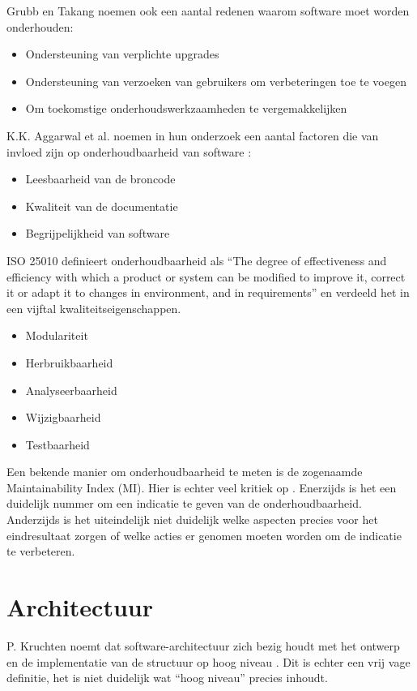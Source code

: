 Grubb en Takang noemen ook een aantal redenen waarom software moet worden onderhouden:
\begin{itemize}
	\item Ondersteuning van verplichte upgrades
	\item Ondersteuning van verzoeken van gebruikers om verbeteringen toe te voegen
	\item Om toekomstige onderhoudswerkzaamheden te vergemakkelijken
\end{itemize}

K.K. Aggarwal et al. noemen in hun onderzoek een aantal factoren die van invloed zijn op onderhoudbaarheid van software \parencite{MaintainabilityMeasure}:
\begin{itemize}
	\item Leesbaarheid van de broncode
	\item Kwaliteit van de documentatie
	\item Begrijpelijkheid van software
\end{itemize}

ISO 25010 \parencite{ISO25010} definieert onderhoudbaarheid als \enquote{The degree of effectiveness and efficiency with which a product or system can be modified to improve it, correct it or adapt it to changes in environment, and in requirements} en verdeeld het in een vijftal kwaliteitseigenschappen.
\begin{itemize}
	\item Modulariteit
	\item Herbruikbaarheid
	\item Analyseerbaarheid
	\item Wijzigbaarheid
	\item Testbaarheid
\end{itemize}

Een bekende manier om onderhoudbaarheid te meten is de zogenaamde Maintainability Index (MI). Hier is echter veel kritiek op \parencite{MaintainabilityLiteratureReview, WhyNoMI, WhyNoMI2, MeasuringMaintainability}. Enerzijds is het een duidelijk nummer om een indicatie te geven van de onderhoudbaarheid. Anderzijds is het uiteindelijk niet duidelijk welke aspecten precies voor het eindresultaat zorgen of welke acties er genomen moeten worden om de indicatie te verbeteren.

\section{Architectuur}
P. Kruchten noemt dat software-architectuur zich bezig houdt met het ontwerp en de implementatie van de structuur op hoog niveau \parencite{4plus1}. Dit is echter een vrij vage definitie, het is niet duidelijk wat \enquote{hoog niveau} precies inhoudt.

